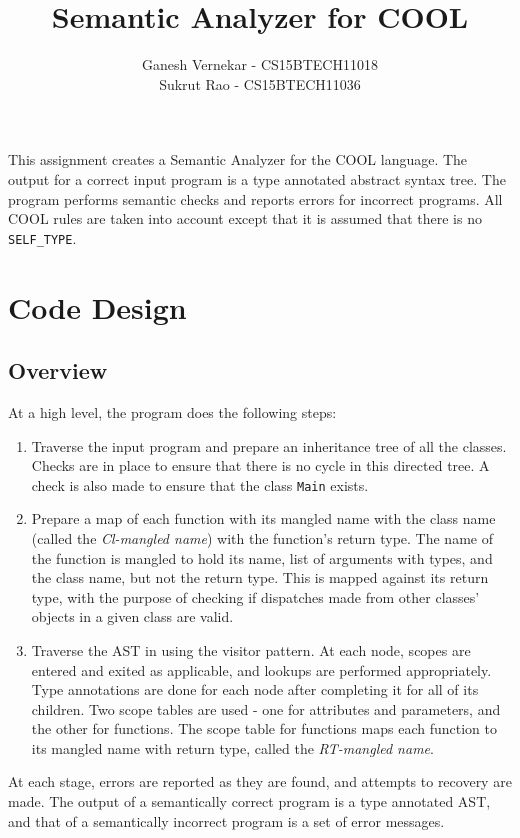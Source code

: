 \documentclass{article}
\title{Semantic Analyzer for COOL}
\author{Ganesh Vernekar - CS15BTECH11018 \\ Sukrut Rao - CS15BTECH11036}
\begin{document}
	\maketitle
	
This assignment creates a Semantic Analyzer for the COOL language. The output for a correct input program is a type annotated abstract syntax tree. The program performs semantic checks and reports errors for incorrect programs. All COOL rules are taken into account except that it is assumed that there is no \verb|SELF_TYPE|.
	
\section{Code Design}
\subsection*{Overview}
At a high level, the program does the following steps:
\begin{enumerate}
	\item Traverse the input program and prepare an inheritance tree of all the classes. Checks are in place to ensure that there is no cycle in this directed tree. A check is also made to ensure that the class \verb|Main| exists.
	\item Prepare a map of each function with its mangled name with the class name (called the \textit{Cl-mangled name}) with the function's return type. The name of the function is mangled to hold its name, list of arguments with types, and the class name, but not the return type. This is mapped against its return type, with the purpose of checking if dispatches made from other classes' objects in a given class are valid.
	\item Traverse the AST in using the visitor pattern. At each node, scopes are entered and exited as applicable, and lookups are performed appropriately. Type annotations are done for each node after completing it for all of its children. Two scope tables are used - one for attributes and parameters, and the other for functions. The scope table for functions maps each function to its mangled name with return type, called the \textit{RT-mangled name}.
\end{enumerate}
At each stage, errors are reported as they are found, and attempts to recovery are made. The output of a semantically correct program is a type annotated AST, and that of a semantically incorrect program is a set of error messages.
\end{document}
